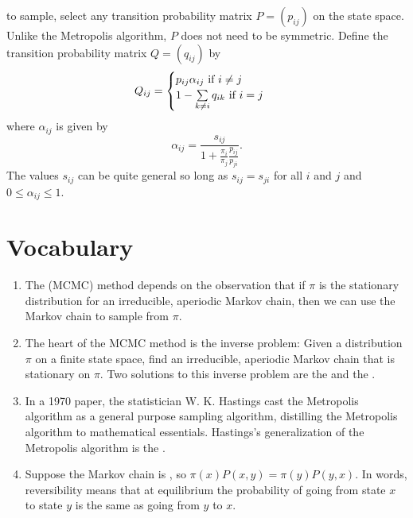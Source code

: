 \documentclass[12pt]{article}
\begin{document}
\begin{enumerate}
        \pi \) to sample, select any transition probability matrix \( P
        = (p_{ij}) \) on the state space.  Unlike the Metropolis
        algorithm, \( P \) does not need to be symmetric.  Define the
        transition probability matrix \( Q= (q_{ij}) \) by
        \[
            Q_{ij} =
            \begin{cases}
                p_{ij} \alpha_{ij} \text{ if \( i \ne j \) } \\
                1 - \sum\limits_ {k \ne i} q_{ik} \text{ if \( i = j \) }
            \end{cases}
        \] where \( \alpha_{ij} \) is given by
        \[
            \alpha_{ij} = \frac{s_{ij}}{1 + \frac{\pi_i}{\pi_j} \frac{p_
            {ij}}{p_{ji}}}.
        \] The values \( s_{ij} \) can be quite general so long as \( s_
        {ij} = s_{ji} \) for all \( i \) and \( j \) and \( 0 \le \alpha_
        {ij} \le 1 \).
\end{enumerate}

\hr

\section*{Vocabulary}
\begin{enumerate}
    \item
        The  (MCMC) method depends on the
        observation that if \( \pi \) is the stationary distribution for
        an irreducible, aperiodic Markov chain, then we can use the
        Markov chain to sample from \( \pi \).
    \item
        The heart of the MCMC method is the inverse problem:  Given a
        distribution \( \pi \) on a finite state space, find an
        irreducible, aperiodic Markov chain that is stationary on \( \pi
        \). Two solutions to this inverse problem are the  and the .
    \item
        In a 1970 paper, the statistician W. K. Hastings cast the
        Metropolis algorithm as a general purpose sampling algorithm,
        distilling the Metropolis algorithm to mathematical essentials.
        Hastings's generalization of the Metropolis algorithm is the
        .
    \item
        Suppose the Markov chain is , so \( \pi(x)
        P(x,y) = \pi(y) P(y,x) \).  In words, reversibility means
        that at equilibrium the probability of going from state \( x \)
        to state \( y \) is the same as going from \( y \) to \( x \).
\end{enumerate}
\end{document}
